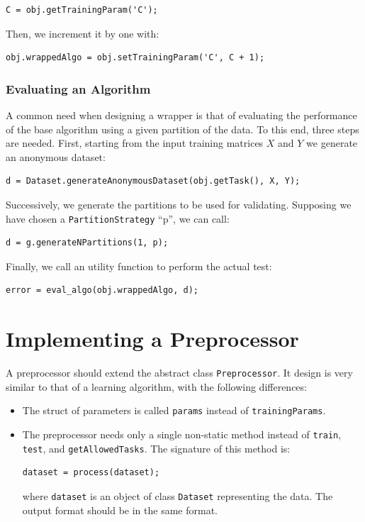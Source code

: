 \begin{lstlisting}
C = obj.getTrainingParam('C');
\end{lstlisting}

\noindent Then, we increment it by one with:

\begin{lstlisting}
obj.wrappedAlgo = obj.setTrainingParam('C', C + 1);
\end{lstlisting}

\subsubsection{Evaluating an Algorithm}

A common need when designing a wrapper is that of evaluating the performance of the base algorithm using a given partition of the data. To this end, three steps are needed. First, starting from the input training matrices $X$ and $Y$ we generate an anonymous dataset:

\begin{lstlisting}
d = Dataset.generateAnonymousDataset(obj.getTask(), X, Y);
\end{lstlisting}

\noindent Successively, we generate the partitions to be used for validating. Supposing we have chosen a \verb|PartitionStrategy| ``p'', we can call:

\begin{lstlisting}
d = g.generateNPartitions(1, p);
\end{lstlisting}

\noindent Finally, we call an utility function to perform the actual test:

\begin{lstlisting}
error = eval_algo(obj.wrappedAlgo, d);
\end{lstlisting}

\section{Implementing a Preprocessor}

A preprocessor should extend the abstract class \verb|Preprocessor|. It design is very similar to that of a learning algorithm, with the following differences:

\begin{itemize}
	\item The struct of parameters is called \verb|params| instead of \verb|trainingParams|.
	\item The preprocessor needs only a single non-static method instead of \verb|train|, \verb|test|, and \verb|getAllowedTasks|. The signature of this method is:
	
\begin{lstlisting}
dataset = process(dataset);
\end{lstlisting}
	
	\noindent where \verb|dataset| is an object of class \verb|Dataset| representing the data. The output format should be in the same format.
\end{itemize}



